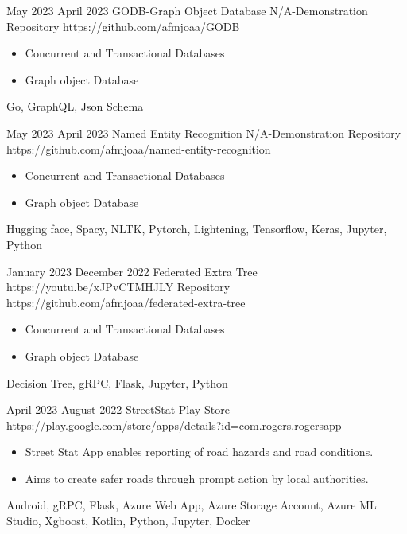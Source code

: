 
\horizontalLine
\begin{universalList}
  \universalListItem
    {May 2023}
    {April 2023}
    {GODB-Graph Object Database}
    {N/A-Demonstration}
    {Repository}
    {https://github.com/afmjoaa/GODB}
    {
      \begin{itemize}
        \item Concurrent and Transactional Databases
        \item Graph object Database
      \end{itemize}
    }
    {Go, GraphQL, Json Schema}

  \emptySeparator
  \universalListItem
    {May 2023}
    {April 2023}
    {Named Entity Recognition}
    {N/A-Demonstration}
    {Repository}
    {https://github.com/afmjoaa/named-entity-recognition}
    {
      \begin{itemize}
        \item Concurrent and Transactional Databases
        \item Graph object Database
      \end{itemize}
    }
    {Hugging face, Spacy, NLTK, Pytorch, Lightening, Tensorflow, Keras, Jupyter, Python}

  \emptySeparator
  \universalListItem
    {January 2023}
    {December 2022}
    {Federated Extra Tree}
    {https://youtu.be/xJPvCTMHJLY}
    {Repository}
    {https://github.com/afmjoaa/federated-extra-tree}
    {
      \begin{itemize}
        \item Concurrent and Transactional Databases
        \item Graph object Database
      \end{itemize}
    }
    {Decision Tree, gRPC, Flask, Jupyter, Python}

  \emptySeparator
  \universalListItemWithoutLink
    {April 2023}
    {August 2022}
    {StreetStat}
    {Play Store}
    {https://play.google.com/store/apps/details?id=com.rogers.rogersapp}
    {
      \begin{itemize}
        \item Street Stat App enables reporting of road hazards and road conditions.
        \item Aims to create safer roads through prompt action by local authorities.
      \end{itemize}
    }
    {Android, gRPC, Flask, Azure Web App, Azure Storage Account, Azure ML Studio, Xgboost, Kotlin, Python, Jupyter, Docker}


\end{universalList}
